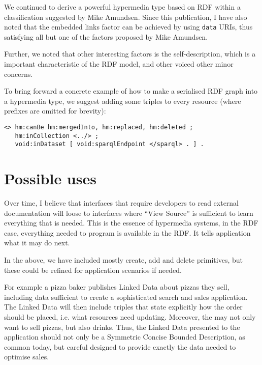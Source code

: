 \documentclass{article}
\begin{document}
We continued to derive a powerful hypermedia type based on RDF within
a classification suggested by Mike Amundsen. Since this publication, I
have also noted that the embedded links factor can be achieved by
using \texttt{data} URIs, thus satisfying all but one of the factors
proposed by Mike Amundsen.

Further, we noted that other interesting factors is the
self-description, which is a important characteristic of the RDF
model, and other voiced other minor concerns.

To bring forward a concrete example of how to make a serialised RDF
graph into a hypermedia type, we suggest adding some triples to every
resource (where prefixes are omitted for brevity):

\begin{verbatim}
<> hm:canBe hm:mergedInto, hm:replaced, hm:deleted ;
   hm:inCollection <../> ;
   void:inDataset [ void:sparqlEndpoint </sparql> . ] .
\end{verbatim}

\section{Possible uses}

Over time, I believe that interfaces that require developers to read
external documentation will loose to interfaces where ``View Source''
is sufficient to learn everything that is needed. This is the essence
of hypermedia systems, in the RDF case, everything needed to program
is available in the RDF. It tells application what it may do next.

In the above, we have included mostly create, add and delete
primitives, but these could be refined for application scenarios if
needed.

For example a pizza baker publishes Linked Data about pizzas they
sell, including data sufficient to create a sophisticated search and
sales application. The Linked Data will then include triples that
state explicitly how the order should be placed, i.e. what resources
need updating. Moreover, the may not only want to sell pizzas, but
also drinks. Thus, the Linked Data presented to the application should
not only be a Symmetric Concise Bounded Description, as common today,
but careful designed to provide exactly the data needed to optimise
sales.


%
%

\end{document}
